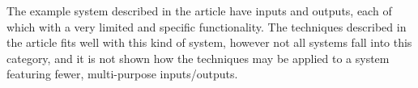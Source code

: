 \documentclass[Main]{subfiles}
\begin{document}
The example system described in the article have inputs and outputs, each of which with a very limited and specific functionality. The techniques described in the article fits well with this kind of system, however not all systems fall into this category, and it is not shown how the techniques may be applied to a system featuring fewer, multi-purpose inputs/outputs.
\end{document}
